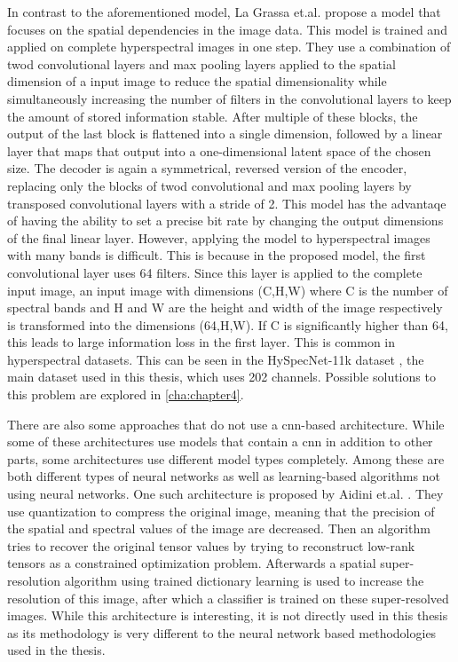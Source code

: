 In contrast to the aforementioned model, La Grassa et.al. \citep{la_grassa_hyperspectral_2022} propose a model that focuses on the spatial dependencies in the image data. This model is trained and applied on complete hyperspectral images in one step. They use a combination of \ac{twod} convolutional layers and max pooling layers applied to the spatial dimension of a input image to reduce the spatial dimensionality while simultaneously increasing the number of filters in the convolutional layers to keep the amount of stored information stable. After multiple of these blocks, the output of the last block is flattened into a single dimension, followed by a linear layer that maps that output into a one-dimensional latent space of the chosen size. The decoder is again a symmetrical, reversed version of the encoder, replacing only the blocks of \ac{twod} convolutional and max pooling layers by transposed convolutional layers with a stride of 2. This model has the advantaqe of having the ability to set a precise bit rate by changing the output dimensions of the final linear layer. However, applying the model to hyperspectral images with many bands is difficult. This is because in the proposed model, the first convolutional layer uses 64 filters. Since this layer is applied to the complete input image, an input image with dimensions (C,H,W) where C is the number of spectral bands and H and W are the height and width of the image respectively is transformed into the dimensions (64,H,W). If C is significantly higher than 64, this leads to large information loss in the first layer. This is common in hyperspectral datasets. This can be seen in the HySpecNet-11k dataset \citep{fuchs_hyspecnet-11k_2023}, the main dataset used in this thesis, which uses 202 channels. Possible solutions to this problem are explored in \autoref{cha:chapter4}.

There are also some approaches that do not use a \ac{cnn}-based architecture. While some of these architectures use models that contain a \ac{cnn} in addition to other parts, some architectures use different model types completely. Among these are both different types of neural networks as well as learning-based algorithms not using neural networks.
One such architecture is proposed by Aidini et.al. \citep{aidini_hyperspectral_2019}. They use quantization to compress the original image, meaning that the precision of the spatial and spectral values of the image are decreased. Then an algorithm tries to recover the original tensor values by trying to reconstruct low-rank tensors as a constrained optimization problem. Afterwards a spatial super-resolution algorithm using trained dictionary learning is used to increase the resolution of this image, after which a classifier is trained on these super-resolved images. While this architecture is interesting, it is not directly used in this thesis as its methodology is very different to the neural network based methodologies used in the thesis.

